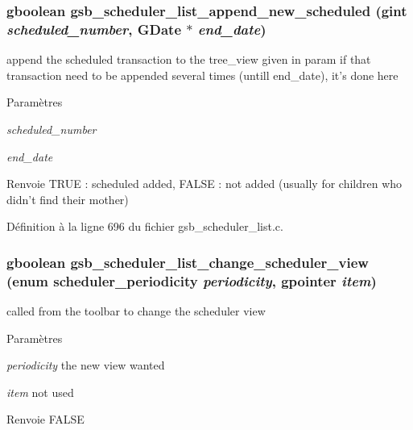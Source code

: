 \subsubsection[{gsb\_\-scheduler\_\-list\_\-append\_\-new\_\-scheduled}]{\setlength{\rightskip}{0pt plus 5cm}gboolean gsb\_\-scheduler\_\-list\_\-append\_\-new\_\-scheduled (gint {\em scheduled\_\-number}, \/  GDate $\ast$ {\em end\_\-date})}\label{gsb__scheduler__list_8c_a44db4084e9e03a49fb9c73b5bff9e788}
append the scheduled transaction to the tree\_\-view given in param if that transaction need to be appended several times (untill end\_\-date), it's done here


\begin{DoxyParams}{Paramètres}
\item[{\em scheduled\_\-number}]\item[{\em end\_\-date}]\end{DoxyParams}
\begin{DoxyReturn}{Renvoie}
TRUE : scheduled added, FALSE : not added (usually for children who didn't find their mother) 
\end{DoxyReturn}


Définition à la ligne 696 du fichier gsb\_\-scheduler\_\-list.c.

\subsubsection[{gsb\_\-scheduler\_\-list\_\-change\_\-scheduler\_\-view}]{\setlength{\rightskip}{0pt plus 5cm}gboolean gsb\_\-scheduler\_\-list\_\-change\_\-scheduler\_\-view (enum {\bf scheduler\_\-periodicity} {\em periodicity}, \/  gpointer {\em item})}\label{gsb__scheduler__list_8c_a56cddba54e3383ebe1506b9a94e22a26}
called from the toolbar to change the scheduler view


\begin{DoxyParams}{Paramètres}
\item[{\em periodicity}]the new view wanted \item[{\em item}]not used\end{DoxyParams}
\begin{DoxyReturn}{Renvoie}
FALSE 
\end{DoxyReturn}


